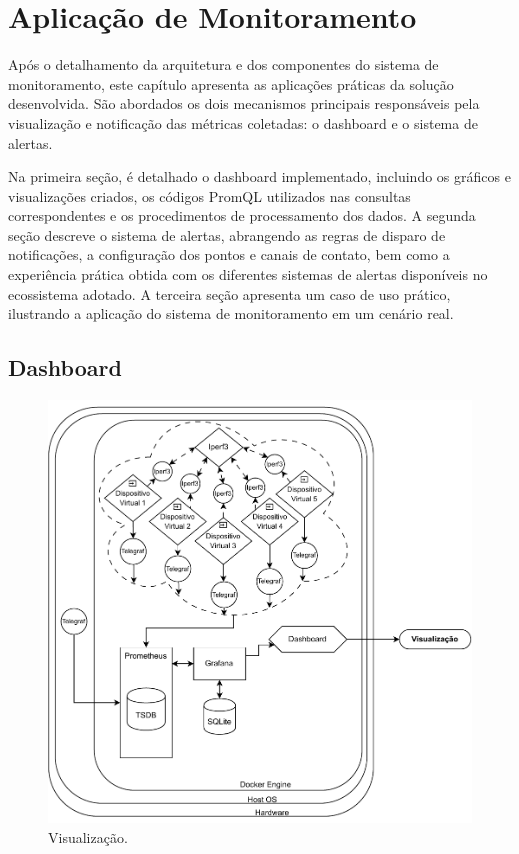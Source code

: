 \chapter{Aplicação de Monitoramento}
\label{chap4}

{\color{red}
Após o detalhamento da arquitetura e dos componentes do sistema de monitoramento, este capítulo apresenta as aplicações práticas da solução desenvolvida. São abordados os dois mecanismos principais responsáveis pela visualização e notificação das métricas coletadas: o dashboard e o sistema de alertas.

Na primeira seção, é detalhado o dashboard implementado, incluindo os gráficos e visualizações criados, os códigos PromQL utilizados nas consultas correspondentes e os procedimentos de processamento dos dados. A segunda seção descreve o sistema de alertas, abrangendo as regras de disparo de notificações, a configuração dos pontos e canais de contato, bem como a experiência prática obtida com os diferentes sistemas de alertas disponíveis no ecossistema adotado. A terceira seção apresenta um caso de uso prático, ilustrando a aplicação do sistema de monitoramento em um cenário real.

\section{Dashboard}
\label{section:Dashboard}

\begin{figure}[h]
\centering
\setlength{\abovecaptionskip}{-20pt}
\includegraphics[width=\textwidth]{Imagens/chap04/by-blocks/dashboard_diagram.pdf}
\caption{Visualização.}
\label{fig:DiagramaVisualizacao}
\end{figure}


}





